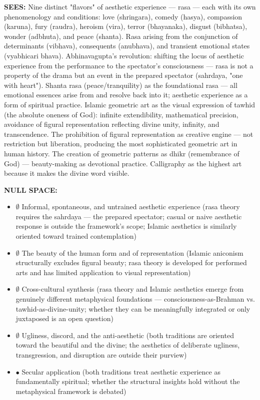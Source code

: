 \textbf{SEES:} Nine distinct "flavors" of aesthetic experience — rasa — each with its own phenomenology and conditions: love (shringara), comedy (hasya), compassion (karuna), fury (raudra), heroism (vira), terror (bhayanaka), disgust (bibhatsa), wonder (adbhuta), and peace (shanta). Rasa arising from the conjunction of determinants (vibhava), consequents (anubhava), and transient emotional states (vyabhicari bhava). Abhinavagupta's revolution: shifting the locus of aesthetic experience from the performance to the spectator's consciousness — rasa is not a property of the drama but an event in the prepared spectator (sahrdaya, "one with heart"). Shanta rasa (peace/tranquility) as the foundational rasa — all emotional essences arise from and resolve back into it; aesthetic experience as a form of spiritual practice. Islamic geometric art as the visual expression of tawhid (the absolute oneness of God): infinite extendibility, mathematical precision, avoidance of figural representation reflecting divine unity, infinity, and transcendence. The prohibition of figural representation as creative engine — not restriction but liberation, producing the most sophisticated geometric art in human history. The creation of geometric patterns as dhikr (remembrance of God) — beauty-making as devotional practice. Calligraphy as the highest art because it makes the divine word visible.


\textbf{NULL SPACE:}

\begin{itemize}[nosep,leftmargin=*]
  \item $\emptyset$ Informal, spontaneous, and untrained aesthetic experience (rasa theory requires the sahrdaya — the prepared spectator; casual or naive aesthetic response is outside the framework's scope; Islamic aesthetics is similarly oriented toward trained contemplation)
  \item $\emptyset$ The beauty of the human form and of representation (Islamic aniconism structurally excludes figural beauty; rasa theory is developed for performed arts and has limited application to visual representation)
  \item $\emptyset$ Cross-cultural synthesis (rasa theory and Islamic aesthetics emerge from genuinely different metaphysical foundations — consciousness-as-Brahman vs. tawhid-as-divine-unity; whether they can be meaningfully integrated or only juxtaposed is an open question)
  \item $\emptyset$ Ugliness, discord, and the anti-aesthetic (both traditions are oriented toward the beautiful and the divine; the aesthetics of deliberate ugliness, transgression, and disruption are outside their purview)
  \item $\bullet$ Secular application (both traditions treat aesthetic experience as fundamentally spiritual; whether the structural insights hold without the metaphysical framework is debated)
\end{itemize}


